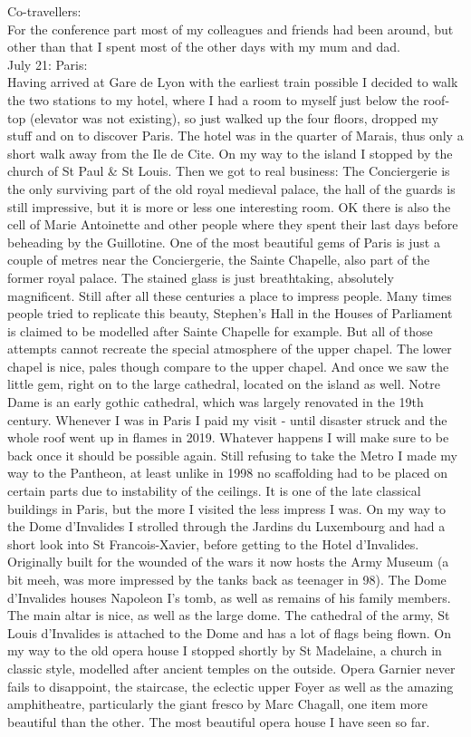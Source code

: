 Co-travellers:\\
For the conference part most of my colleagues and friends had been around, but other than that I spent most of the other days with my mum and dad.\\

July 21: Paris:\\
Having arrived at Gare de Lyon with the earliest train possible I decided to walk the two stations to my hotel, where I had a room to myself just below the roof-top (elevator was not existing), so just walked up the four floors, dropped my stuff and on to discover Paris. The hotel was in the quarter of Marais, thus only a short walk away from the Ile de Cite. On my way to the island I stopped by the church of St Paul \& St Louis. Then we got to real business: The Conciergerie is the only surviving part of the old royal medieval palace, the hall of the guards is still impressive, but it is more or less one interesting room. OK there is also the cell of Marie Antoinette and other people where they spent their last days before beheading by the Guillotine. One of the most beautiful gems of Paris is just a couple of metres near the Conciergerie, the Sainte Chapelle, also part of the former royal palace. The stained glass is just breathtaking, absolutely magnificent. Still after all these centuries a place to impress people. Many times people tried to replicate this beauty, Stephen's Hall in the Houses of Parliament is claimed to be modelled after Sainte Chapelle for example. But all of those attempts cannot recreate the special atmosphere of the upper chapel. The lower chapel is nice, pales though compare to the upper chapel. And once we saw the little gem, right on to the large cathedral, located on the island as well. Notre Dame is an early gothic cathedral, which was largely renovated in the 19th century. Whenever I was in Paris I paid my visit - until disaster struck and the whole roof went up in flames in 2019. Whatever happens I will make sure to be back once it should be possible again. Still refusing to take the Metro I made my way to the Pantheon, at least unlike in 1998 no scaffolding had to be placed on certain parts due to instability of the ceilings. It is one of the late classical buildings in Paris, but the more I visited the less impress I was. On my way to the Dome d'Invalides I strolled through the Jardins du Luxembourg and had a short look into St Francois-Xavier, before getting to the Hotel d'Invalides. Originally built for the wounded of the wars it now hosts the Army Museum (a bit meeh, was more impressed by the tanks back as teenager in 98). The Dome d'Invalides houses Napoleon I's tomb, as well as remains of his family members. The main altar is nice, as well as the large dome. The cathedral of the army, St Louis d'Invalides is attached to the Dome and has a lot of flags being flown. On my way to the old opera house I stopped shortly by St Madelaine, a church in classic style, modelled after ancient temples on the outside. Opera Garnier never fails to disappoint, the staircase, the eclectic upper Foyer as well as the amazing amphitheatre, particularly the giant fresco by Marc Chagall, one item more beautiful than the other. The most beautiful opera house I have seen so far.\\

